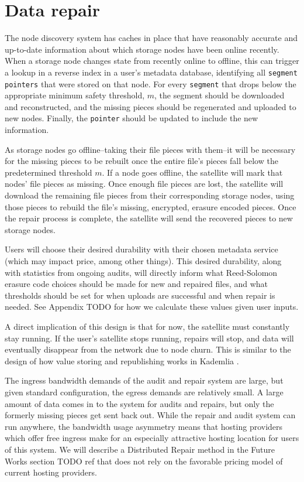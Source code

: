 \documentclass[11pt,fleqn,openany]{book}
\newcommand{\x}[1]{{\tt #1}} \newcommand{\code}[1]{{\em #1}}
\newcommand{\todo}[1]{{\color{red} TODO #1 }}
\begin{document}
\section{Data repair}\label{sec:concrete-data-repair}

The node discovery system has caches in place that have reasonably accurate and
up-to-date information about which storage nodes have been online recently.
When a storage node changes state from recently online to offline, this can
trigger a lookup in a reverse index in a user's metadata database, identifying
all \x{segment} \x{pointers} that were stored on that node.
For every \x{segment} that drops below the appropriate minimum safety
threshold, $m$, the segment should be downloaded and reconstructed, and the
missing pieces should be regenerated and uploaded to new nodes. Finally, the
\x{pointer} should be updated to include the new information.

As storage nodes go offline--taking their file pieces with them--it will
be necessary for the missing pieces to be rebuilt once the entire file's pieces
fall below the predetermined threshold $m$. If a node goes offline, the
satellite will mark that nodes' file pieces as missing.
Once enough file pieces are lost, the satellite will download the
remaining file pieces from their corresponding storage nodes, using those
pieces
to rebuild the file's missing, encrypted, erasure encoded pieces.
Once the repair process is complete, the satellite will send the
recovered pieces to new storage nodes.

Users will choose their desired durability with their chosen metadata service
(which may impact price, among other things). This desired durability, along
with
statistics from ongoing audits, will directly inform what Reed-Solomon erasure
code choices should be made for new and repaired files, and what thresholds
should be set for when uploads are successful and when repair is needed. See
Appendix \todo{} for how we calculate these values given user inputs.

A direct implication of this design is that for now, the satellite must
constantly stay running. If the user's satellite stops running, repairs will
stop, and data will eventually disappear from the network due to node churn.
This is similar to the design of how value storing and republishing works in
Kademlia \cite{kad}.

The ingress bandwidth demands of the audit and repair system are large, but
given standard configuration, the egress demands are relatively small.
A large amount of data comes in to the system for audits and repairs, but only
the formerly missing pieces get sent back out.
While the repair and audit system can run anywhere, the bandwidth usage
asymmetry means that hosting providers which offer free ingress
make for an especially attractive hosting location for users of this system.
We will describe a Distributed Repair method in the Future Works section
\todo{ref} that
does not rely on the favorable pricing model of current hosting providers.
\end{document}
